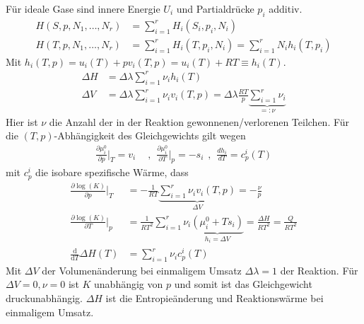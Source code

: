 Für ideale Gase sind innere Energie $U_i$ und Partialdrücke $p_i$ additiv.
\begin{align*}
    H(S,p,N_1,\dots,N_r) &= \sum_{i=1}^r H_i (S_i , p_i , N_i)
    \\
    H(T,p,N_1,\dots,N_r) &= \sum_{i=1}^r H_i(T,p_i,N_i) = \sum_{i=1}^r N_i h_i (T,p_i)
\end{align*}
Mit $h_i(T,p) = u_i(T) + p v_i(T,p) = u_i (T) + R T \equiv h_i(T)$.
\begin{align*}
    \Delta H &= \Delta \lambda \sum_{i=1}^r \nu_i h_i (T)
    \\
    \Delta V &= \Delta \lambda \sum_{i=1}^r \nu_i v_i (T,p)
        = \Delta \lambda \frac{R T}{p} \underbrace{\sum_{i=1}^r \nu_i}_{=: \nu}
\end{align*}
Hier ist $\nu$ die Anzahl der in der Reaktion gewonnenen/verlorenen Teilchen.
Für die $(T,p)$-Abhängigkeit des Gleichgewichts gilt wegen
\begin{align*}
    \frac{\partial \mu_i^0}{\partial p} \Big|_T = v_i
    \hspace{5pt} &, \hspace{5pt}
    \frac{\partial \mu_i^0}{\partial T} \Big|_p = - s_i
    \hspace{5pt} , \hspace{5pt}
    \frac{d h_i}{d T} = c_p^i (T)
\end{align*}
mit $c_p^i$ die isobare spezifische Wärme, dass
\begin{align*}
    \frac{\partial \log(K)}{\partial p} \Big|_T
    &= - \frac{1}{R T} \underbrace{\sum_{i=1}^r \nu_i v_i (T,p)}_{\Delta V}
    = - \frac{\nu}{p}
    \\
    \frac{\partial \log(K)}{\partial T} \Big|_p
    &= \frac{1}{R T^2} \sum_{i=1}^r \nu_i \underbrace{(\mu_i^0 + T s_i)}_{h_i = \Delta V}
    = \frac{\Delta H}{R T^2} = \frac{Q}{R T^2}
    \\
    \frac{\mathrm{d}}{\mathrm{d} T} \Delta H(T)
    &= \sum_{i=1}^r \nu_i c_p^i (T)
\end{align*}
Mit $\Delta V$ der Volumenänderung bei einmaligem Umsatz $\Delta \lambda = 1$ der
Reaktion. Für $\Delta V = 0,\nu=0$ ist $K$ unabhängig von $p$ und somit ist das
Gleichgewicht druckunabhängig. $\Delta H$ ist die Entropieänderung und Reaktionswärme
bei einmaligem Umsatz.

